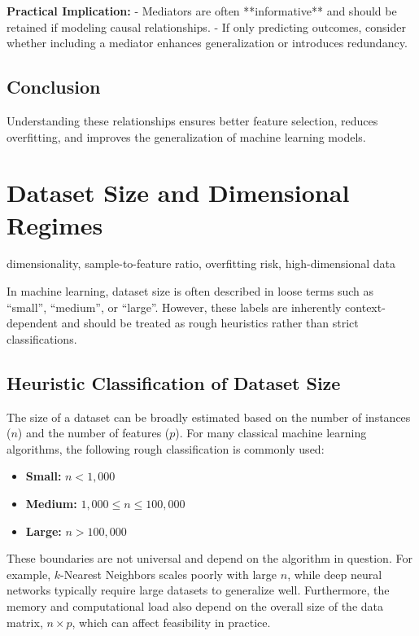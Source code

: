 \documentclass[12pt,openany, draft]{book}
\begin{document}
\textbf{Practical Implication:}
- Mediators are often **informative** and should be retained if modeling causal relationships.
- If only predicting outcomes, consider whether including a mediator enhances generalization or introduces redundancy.

\subsection{Conclusion}

Understanding these relationships ensures better feature selection, reduces overfitting, and improves the generalization of machine learning models.



\section{Dataset Size and Dimensional Regimes}

\begin{keywordsbox}
dimensionality, sample-to-feature ratio, overfitting risk, high-dimensional data
\end{keywordsbox}


In machine learning, dataset size is often described in loose terms such as ``small'', ``medium'', or ``large''. However, these labels are inherently context-dependent and should be treated as rough heuristics rather than strict classifications.

\subsection{Heuristic Classification of Dataset Size}

The size of a dataset can be broadly estimated based on the number of instances (\(n\)) and the number of features (\(p\)). For many classical machine learning algorithms, the following rough classification is commonly used:

\begin{itemize}
    \item \textbf{Small:} \(n < 1{,}000\)
    \item \textbf{Medium:} \(1{,}000 \leq n \leq 100{,}000\)
    \item \textbf{Large:} \(n > 100{,}000\)
\end{itemize}

These boundaries are not universal and depend on the algorithm in question. For example, \(k\)-Nearest Neighbors scales poorly with large \(n\), while deep neural networks typically require large datasets to generalize well. Furthermore, the memory and computational load also depend on the overall size of the data matrix, \(n \times p\), which can affect feasibility in practice.
\end{document}

